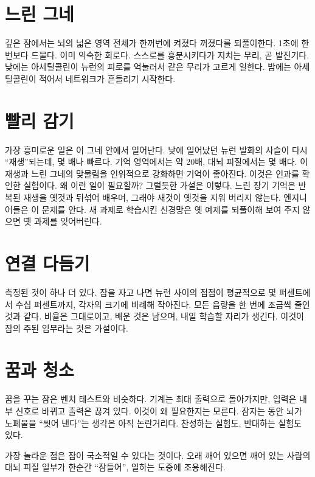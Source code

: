 \section*{느린 그네}

깊은 잠에서는 뇌의 넓은 영역 전체가 한꺼번에 켜졌다 꺼졌다를 되풀이한다. 1초에 한 번보다 드물다. 이미 익숙한 회로다. 스스로를 흥분시키다가 지치는 무리, 곧 발진기다. 낮에는 아세틸콜린이 뉴런의 피로를 억눌러서 같은 무리가 고르게 일한다. 밤에는 아세틸콜린이 적어서 네트워크가 흔들리기 시작한다.


\section*{빨리 감기}

가장 흥미로운 일은 이 그네 안에서 일어난다. 낮에 일어났던 뉴런 발화의 사슬이 다시 “재생”되는데, 몇 배나 빠르다. 기억 영역에서는 약 20배, 대뇌 피질에서는 몇 배다. 이 재생과 느린 그네의 맞물림을 인위적으로 강화하면 기억이 좋아진다. 이것은 인과를 확인한 실험이다. 왜 이런 일이 필요할까? 그럴듯한 가설은 이렇다. 느린 장기 기억은 반복된 재생을 옛것과 뒤섞어 배우며, 그래야 새것이 옛것을 지워 버리지 않는다. 엔지니어들은 이 문제를 안다. 새 과제로 학습시킨 신경망은 옛 예제를 되풀이해 보여 주지 않으면 옛 과제를 잊어버린다.

\section*{연결 다듬기}

측정된 것이 하나 더 있다. 잠을 자고 나면 뉴런 사이의 접점이 평균적으로 몇 퍼센트에서 수십 퍼센트까지, 각자의 크기에 비례해 작아진다. 모든 음량을 한 번에 조금씩 줄인 것과 같다. 비율은 그대로이고, 배운 것은 남으며, 내일 학습할 자리가 생긴다. 이것이 잠의 주된 임무라는 것은 가설이다.

\section*{꿈과 청소}

꿈을 꾸는 잠은 벤치 테스트와 비슷하다. 기계는 최대 출력으로 돌아가지만, 입력은 내부 신호로 바뀌고 출력은 끊겨 있다. 이것이 왜 필요한지는 모른다. 잠자는 동안 뇌가 노폐물을 “씻어 낸다”는 생각은 아직 논란거리다. 찬성하는 실험도, 반대하는 실험도 있다.

가장 놀라운 점은 잠이 국소적일 수 있다는 것이다. 오래 깨어 있으면 깨어 있는 사람의 대뇌 피질 일부가 한순간 “잠들어”, 일하는 도중에 조용해진다.

